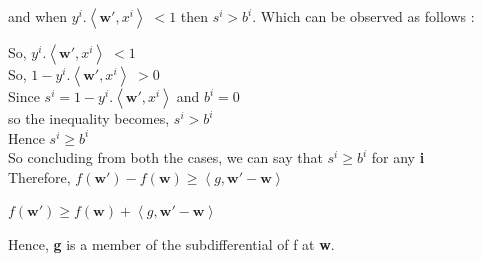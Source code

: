 \documentclass[a4paper,11pt]{article}
\begin{document}
\begin{mlsolution}
and when \begin{math}y^{i}.\left \langle \textbf{w}{}', x^{i} \right \rangle \; <  1\end{math}
then \; \begin{math} s^{i} > b^{i}\end{math}. Which can be observed as follows :
 
So, \begin{math}y^{i}.\left \langle \textbf{w}{}', x^{i} \right \rangle \; <  1 \end{math} \\

So, \begin{math} 1- y^{i}.\left \langle \textbf{w}{}', x^{i} \right \rangle \; >  0 \end{math} \\

Since \begin{math} s^{i} = 1- y^{i}.\left \langle \textbf{w}{}', x^{i} \right \rangle \; \end{math}and \begin{math} b^{i} = 0 \end{math} \\

so the inequality becomes, \begin{math} s^{i} > b^{i} \end{math}\\

Hence \begin{math} s^{i} \geq b^{i} \end{math}\\

So concluding from both the cases, we can say that \begin{math} s^{i} \geq b^{i} \end{math} for any \textbf{i}\\

Therefore, \begin{math}
f\left ( \textbf{w}{}' \right ) - f\left ( \textbf{w} \right ) \geq  \left \langle g, \textbf{w}{}' - \textbf{w} \right \rangle
\end{math}


\begin{math}
f\left ( \textbf{w}{}' \right ) \geq f\left ( \textbf{w} \right ) + \left \langle g, \textbf{w}{}' - \textbf{w} \right \rangle
\end{math}

Hence, \textbf{g} is a member of the subdifferential of f at \textbf{w}.
\end{mlsolution}
\end{document}

